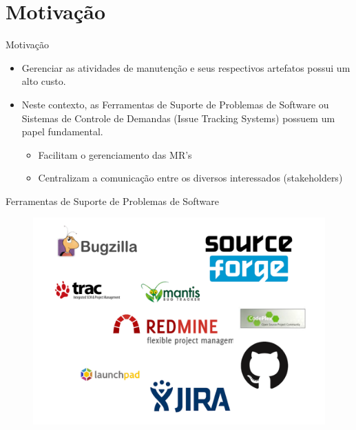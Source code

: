 \documentclass[t,14pt,mathserif]{beamer}
\begin{document}
\section{Motivação}

\begin{frame}{Motivação}

	\begin{itemize}
		\item Gerenciar as atividades de manutenção e seus respectivos artefatos possui um alto custo.
		\item Neste contexto, as Ferramentas de Suporte de Problemas de Software ou Sistemas de Controle de Demandas (Issue Tracking Systems) possuem um papel fundamental.
			\begin{itemize}
				\item Facilitam o gerenciamento das MR's
				\item Centralizam a comunicação entre os diversos interessados (stakeholders)
			\end{itemize}
	\end{itemize}

\end{frame}

\begin{frame}{Ferramentas de Suporte de Problemas de Software}

		\begin{figure}[hbtp]
			\centering
			\includegraphics[scale=.3]{../img/issue-tracking-sytem.png}
		\end{figure}
\end{frame}
\end{document}
